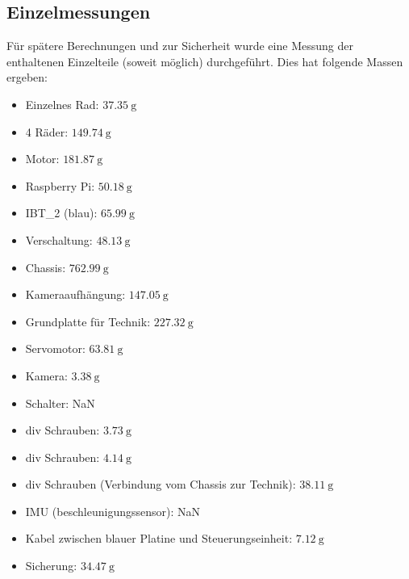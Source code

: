 \documentclass[10pt]{article}
\begin{document}
    \subsection{Einzelmessungen}
    Für spätere Berechnungen und zur Sicherheit wurde eine Messung der enthaltenen Einzelteile (soweit möglich) durchgeführt. Dies hat folgende Massen ergeben:
    \begin{multicols}{3}
    \begin{itemize}
        \item Einzelnes Rad: $\SI{37,35}{\gram}$
        \item 4 Räder: $\SI{149,74}{\gram}$
        \item Motor: $\SI{181,87}{\gram}$
        \item Raspberry Pi: $\SI{50,18}{\gram}$
        \item IBT\_2 (blau): $\SI{65,99}{\gram}$
        \item Verschaltung: $\SI{48,13}{\gram}$
        \item Chassis: $\SI{762,99}{\gram}$
        \item Kameraaufhängung: $\SI{147,05}{\gram}$
        \item Grundplatte für Technik: $\SI{227,32}{\gram}$
        \item Servomotor: $\SI{63,81}{\gram}$
        \item Kamera: $\SI{3,38}{\gram}$
        \item Schalter: NaN
        \item div Schrauben: $\SI{3,73}{\gram}$
        \item div Schrauben: $\SI{4,14}{\gram}$
        \item div Schrauben (Verbindung vom Chassis zur Technik): $\SI{38,11}{\gram}$
        \item IMU (beschleunigungssensor): NaN
        \item Kabel zwischen blauer Platine und Steuerungseinheit: $\SI{7,12}{\gram}$
        \item Sicherung: $\SI{34,47}{\gram}$
    \end{itemize}
    \end{multicols}
\end{document}

